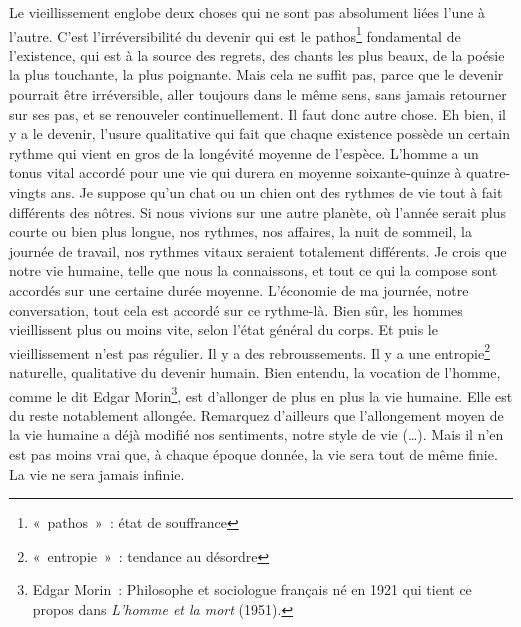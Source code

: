 	{Le vieillissement englobe deux choses qui ne sont pas absolument liées l'une à l'autre. C'est l'irréversibilité du devenir qui est le pathos\footnote{«~pathos~»~: état de souffrance} fondamental de l'existence, qui est à la source des regrets, des chants les plus beaux, de la poésie la plus touchante, la plus poignante. Mais cela ne suffit pas, parce que le devenir pourrait être irréversible, aller toujours dans le même sens, sans jamais retourner sur ses pas, et se renouveler continuellement. Il faut donc autre chose. Eh bien, il y a le devenir, l'usure qualitative qui fait que chaque existence possède un certain rythme qui vient en gros de la longévité moyenne de l'espèce. L'homme a un tonus vital accordé pour une vie qui durera en moyenne soixante-quinze à quatre-vingts ans. Je suppose qu'un chat ou un chien ont des rythmes de vie tout à fait différents des nôtres. Si nous vivions sur une autre planète, où l'année serait plus courte ou bien plus longue, nos rythmes, nos affaires, la nuit de sommeil, la journée de travail, nos rythmes vitaux seraient totalement différents. Je crois que notre vie humaine, telle que nous la connaissons, et tout ce qui la compose sont accordés sur une certaine durée moyenne. L'économie de ma journée, notre conversation, tout cela est accordé sur ce rythme-là. Bien sûr, les hommes vieillissent plus ou moins vite, selon l'état général du corps. Et puis le vieillissement n'est pas régulier. Il y a des rebroussements. Il y a une entropie\footnote{«~entropie~»~: tendance au désordre} naturelle, qualitative du devenir humain. Bien entendu, la vocation de l'homme, comme le dit Edgar Morin\footnote{Edgar Morin~: Philosophe et sociologue français né en 1921 qui tient ce propos dans \emph{L'homme et la mort} (1951).}, est d'allonger de plus en plus la vie humaine. Elle est du reste notablement allongée. Remarquez d'ailleurs que l'allongement moyen de la vie humaine a déjà modifié nos sentiments, notre style de vie (…). Mais il n'en est pas moins vrai que, à chaque époque donnée, la vie sera tout de même finie. La vie ne sera jamais infinie.
}

